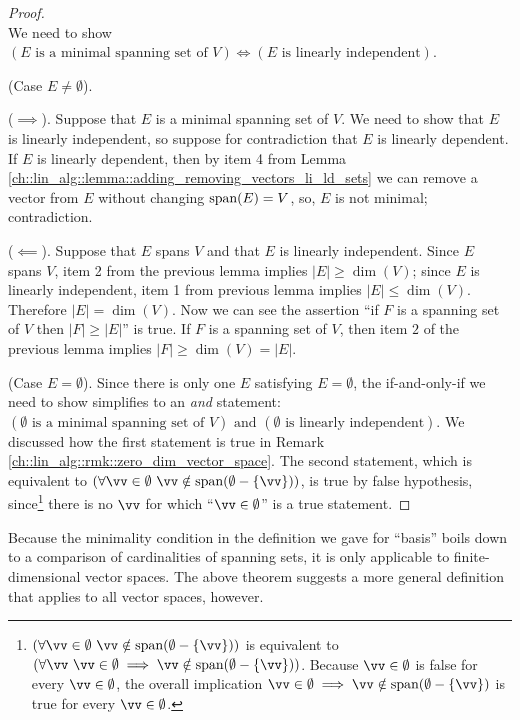 \begin{proof}
    \mbox{} \\ \indent
    We need to show $(\text{$E$ is a minimal spanning set of $V$}) \iff (\text{$E$ is linearly independent})$.
    
    (Case $E \neq \emptyset$).
    
    \indent ($\implies$). Suppose that $E$ is a minimal spanning set of $V$. We need to show that $E$ is linearly independent, so suppose for contradiction that $E$ is linearly dependent. If $E$ is linearly dependent, then by item 4 from Lemma \ref{ch::lin_alg::lemma::adding_removing_vectors_li_ld_sets} we can remove a vector from $E$ without changing $\text{span}(E) = V$, so, $E$ is not minimal; contradiction.
    
    \indent ($\impliedby$). Suppose that $E$ spans $V$ and that $E$ is linearly independent. Since $E$ spans $V$, item 2 from the previous lemma
    implies $|E| \geq \dim(V)$; since $E$ is linearly independent, item 1 from previous lemma implies $|E| \leq \dim(V)$. Therefore $|E| = \dim(V)$. Now we can see the assertion ``if $F$ is a spanning set of $V$ then $|F| \geq |E|$'' is true. If $F$ is a spanning set of $V$, then item $2$ of the previous lemma implies $|F| \geq \dim(V) = |E|$.
    
    (Case $E = \emptyset$). Since there is only one $E$ satisfying $E = \emptyset$, the if-and-only-if we need to show simplifies to an \textit{and} statement: $(\text{$\emptyset$ is a minimal spanning set of $V$}) \text{ and } (\text{$\emptyset$ is linearly independent})$. We discussed how the first statement is true in Remark \ref{ch::lin_alg::rmk::zero_dim_vector_space}. The second statement, which is equivalent to $(\forall \vv \in \emptyset \spc \vv \notin \spann(\emptyset - \{\vv\}))$, is true by false hypothesis, since\footnote{$(\forall \vv \in \emptyset \spc \vv \notin \spann(\emptyset - \{\vv\}))$ is equivalent to $(\forall \vv \spc \vv \in \emptyset \implies \vv \notin \spann(\emptyset - \{\vv\}))$. Because $\vv \in \emptyset$ is false for every $\vv \in \emptyset$, the overall implication $\vv \in \emptyset \implies \vv \notin \spann(\emptyset - \{\vv\})$ is true for every $\vv \in \emptyset$.} there is no $\vv$ for which ``$\vv \in \emptyset$'' is a true statement.
    
    
\end{proof}

Because the minimality condition in the definition we gave for ``basis'' boils down to a comparison of cardinalities of spanning sets, it is only applicable to finite-dimensional vector spaces. The above theorem suggests a more general definition that applies to all vector spaces, however.

